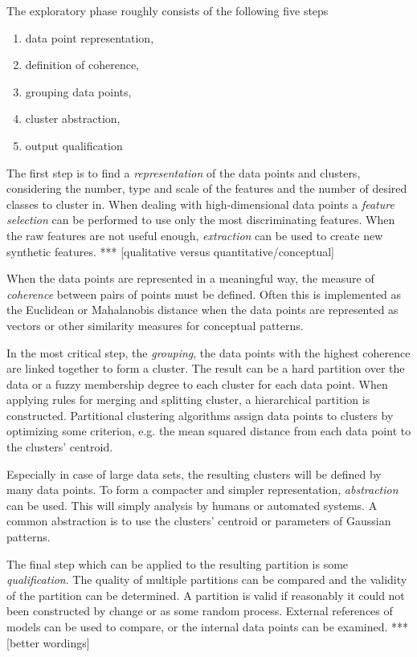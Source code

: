The exploratory phase roughly consists of the following five steps
\cite{jain1999data}
\begin{enumerate}
	\item data point representation,
	\item definition of coherence,
	\item grouping data points,
	\item cluster abstraction,
	\item output qualification
\end{enumerate}

The first step is to find a \emph{representation} of the data points and clusters, considering the number, type and scale of the features and the number of desired classes to cluster in.
When dealing with high-dimensional data points a \emph{feature selection} can be performed to use only the most discriminating features.
When the raw features are not useful enough, \emph{extraction} can be used to create new synthetic features. *** [qualitative versus quantitative/conceptual]

When the data points are represented in a meaningful way, the measure of \emph{coherence} between pairs of points must be defined.
Often this is implemented as the Euclidean or Mahalanobis distance when the data points are represented as vectors or other similarity measures for conceptual patterns.

In the most critical step, the \emph{grouping}, the data points with the highest coherence are linked together to form a cluster.
The result can be a hard partition over the data or a fuzzy membership degree to each cluster for each data point.
When applying rules for merging and splitting cluster, a hierarchical partition is constructed.
Partitional clustering algorithms assign data points to clusters by optimizing some criterion, e.g. the mean squared distance from each data point to the clusters' centroid.

Especially in case of large data sets, the resulting clusters will be defined by many data points.
To form a compacter and simpler representation, \emph{abstraction} can be used.
This will simply analysis by humans or automated systems.
A common abstraction is to use the clusters' centroid \cite{diday1976clustering} or parameters of Gaussian patterns.

The final step which can be applied to the resulting partition is some \emph{qualification}.
The quality of multiple partitions can be compared and the validity of the partition can be determined.
A partition is valid if reasonably it could not been constructed by change or as some random process.
External references of models can be used to compare, or the internal data points can be examined. *** [better wordings]


